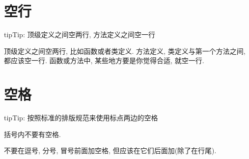 \documentclass[a4paper,10pt,english]{sphinxmanual}
\begin{document}
\section{空行}
\label{\detokenize{python_style_rules:id6}}
\begin{sphinxadmonition}{tip}{Tip:}
顶级定义之间空两行, 方法定义之间空一行
\end{sphinxadmonition}

顶级定义之间空两行, 比如函数或者类定义. 方法定义, 类定义与第一个方法之间, 都应该空一行. 函数或方法中, 某些地方要是你觉得合适, 就空一行.


\section{空格}
\label{\detokenize{python_style_rules:id7}}
\begin{sphinxadmonition}{tip}{Tip:}
按照标准的排版规范来使用标点两边的空格
\end{sphinxadmonition}

括号内不要有空格.

%
\begin{sphinxVerbatim}[commandchars=\\\{\}]
 \PYG{p}{[}\PYG{p}{]}   \PYG{p}{[}\PYG{p}{]}
\end{sphinxVerbatim}

%
\begin{sphinxVerbatim}[commandchars=\\\{\}]
   \PYG{p}{[}  \PYG{p}{]}     \PYG{p}{[} \PYG{p}{]} 
\end{sphinxVerbatim}

不要在逗号, 分号, 冒号前面加空格, 但应该在它们后面加(除了在行尾).

%
\begin{sphinxVerbatim}[commandchars=\\\{\}]
    
           
         
\end{sphinxVerbatim}
\end{document}
